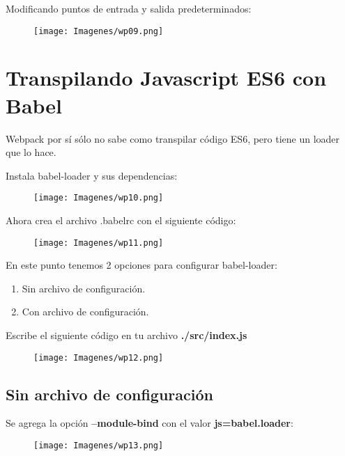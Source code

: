 \item Modificando puntos de entrada y salida predeterminados:
\begin{figure}[h]
    \centering
    \texttt{[image: Imagenes/wp09.png]}
    \label{fig:my_label}
\end{figure}

\newpage
\section{Transpilando Javascript ES6 con Babel}
\item Webpack por sí sólo no sabe como transpilar código ES6, pero tiene un loader que lo hace.

\item Instala babel-loader y sus dependencias:
\begin{figure}[h]
    \centering
    \texttt{[image: Imagenes/wp10.png]}
    \label{fig:my_label}
\end{figure}

\item Ahora crea el archivo .babelrc con el siguiente código:
\begin{figure}[h]
    \centering
    \texttt{[image: Imagenes/wp11.png]}
    \label{fig:my_label}
\end{figure}

\item En este punto tenemos 2 opciones para configurar babel-loader:
\begin{enumerate}
    \item Sin archivo de configuración.
    \item Con archivo de configuración.
\end{enumerate}

\item Escribe el siguiente código en tu archivo \textbf{./src/index.js}
\begin{figure}[h]
    \centering
    \texttt{[image: Imagenes/wp12.png]}
    \label{fig:my_label}
\end{figure}

\newpage
\subsection{Sin archivo de configuración}
\item Se agrega la opción \textbf{--module-bind} con el valor \textbf{js=babel.loader}:
\begin{figure}[h]
    \centering
    \texttt{[image: Imagenes/wp13.png]}
    \label{fig:my_label}
\end{figure}

